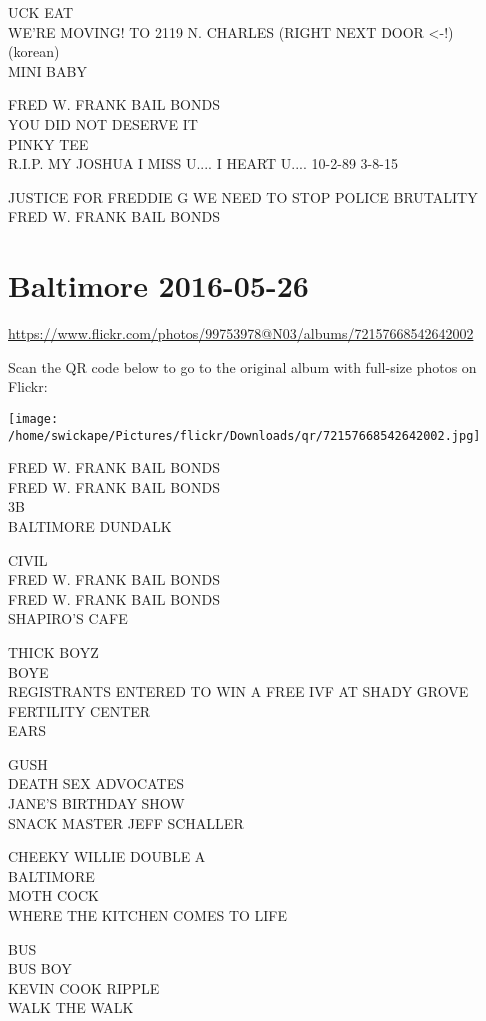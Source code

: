 \documentclass[10pt,letterpaper]{article}
\begin{document}
UCK EAT\\
WE'RE MOVING!  TO 2119 N. CHARLES (RIGHT NEXT DOOR <{-}!)\\
(korean)\\
MINI BABY

FRED W. FRANK BAIL BONDS\\
YOU DID NOT DESERVE IT\\
PINKY TEE\\
R.I.P. MY JOSHUA I MISS U.... I HEART U.... 10{-}2{-}89 3{-}8{-}15

JUSTICE FOR FREDDIE G WE NEED TO STOP POLICE BRUTALITY\\
FRED W. FRANK BAIL BONDS


\section*{Baltimore 2016-05-26}

\url{https://www.flickr.com/photos/99753978@N03/albums/72157668542642002}

Scan the QR code below to go to the original album with full-size photos on Flickr:

\texttt{[image: /home/swickape/Pictures/flickr/Downloads/qr/72157668542642002.jpg]}


FRED W. FRANK BAIL BONDS\\
FRED W. FRANK BAIL BONDS\\
3B\\
BALTIMORE DUNDALK

CIVIL\\
FRED W. FRANK BAIL BONDS\\
FRED W. FRANK BAIL BONDS\\
SHAPIRO'S CAFE

THICK BOYZ\\
BOYE\\
REGISTRANTS ENTERED TO WIN A FREE IVF AT SHADY GROVE FERTILITY CENTER\\
EARS

GUSH\\
DEATH SEX ADVOCATES\\
JANE'S BIRTHDAY SHOW\\
SNACK MASTER JEFF SCHALLER

CHEEKY WILLIE DOUBLE A\\
BALTIMORE\\
MOTH COCK\\
WHERE THE KITCHEN COMES TO LIFE

BUS\\
BUS BOY\\
KEVIN COOK RIPPLE\\
WALK THE WALK
\end{document}
